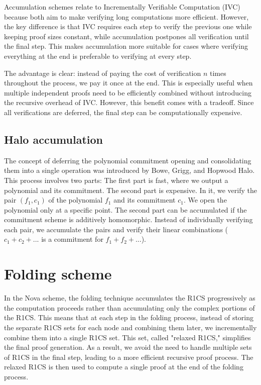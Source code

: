 Accumulation schemes relate to Incrementally Verifiable Computation (IVC) because both aim to make verifying long computations more efficient. 
However, the key difference is that IVC requires each step to verify the previous one while keeping proof sizes constant, while accumulation postpones all verification until the final step. 
This makes accumulation more suitable for cases where verifying everything at the end is preferable to verifying at every step.

The advantage is clear: instead of paying the cost of verification $n$ times throughout the process, we pay it once at the end. 
This is especially useful when multiple independent proofs need to be efficiently combined without introducing the recursive overhead of IVC. 
However, this benefit comes with a tradeoff. Since all verifications are deferred, the final step can be computationally expensive.\cite{BB20}


\subsection{Halo accumulation}
The concept of deferring the polynomial commitment opening and consolidating them into a single operation was introduced by Bowe, Grigg, and Hopwood Halo.\cite{BGH23}
This process involves two parts:
The first part is fast, where we output a polynomial and its commitment.
The second part is expensive. In it, we verify the pair $(f_1, c_1)$ of the polynomial $f_1$ and its commitment $c_1$. We open the polynomial only at a specific point.
The second part can be accumulated if the commitment scheme is additively homomorphic. 
Instead of individually verifying each pair, we accumulate the pairs and verify their linear combinations ($c_1+c_2+...$ is a commitment for $f_1+f_2+...$). \cite{VR23}


\section{Folding scheme}
In the Nova scheme, the folding technique accumulates the R1CS progressively as the computation proceeds rather than accumulating only the complex portions of the R1CS. 
This means that at each step in the folding process, instead of storing the separate R1CS sets for each node and combining them later, we incrementally combine them into a single R1CS set. 
This set, called "relaxed R1CS," simplifies the final proof generation.
As a result, we avoid the need to handle multiple sets of R1CS in the final step, leading to a more efficient recursive proof process. 
The relaxed R1CS is then used to compute a single proof at the end of the folding process.
\cite{Nova23}  \cite{ASI23} \cite{vODC24F}


